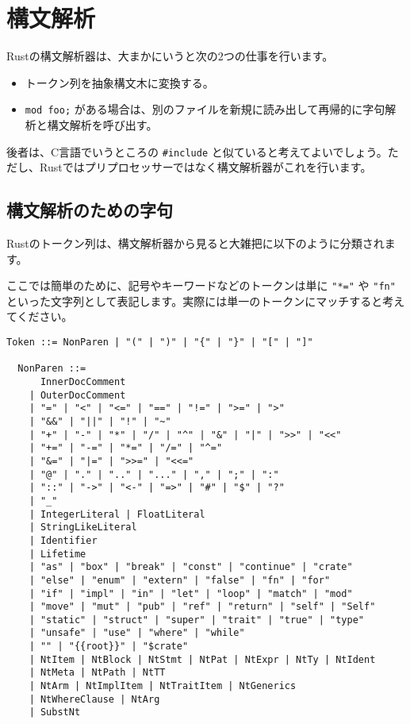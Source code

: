\documentclass[dvipdfmx,uplatex,papersize,a4paper,10pt]{jsbook}
\theoremstyle{definition}
\begin{document}
\section{構文解析}

Rustの構文解析器は、大まかにいうと次の2つの仕事を行います。

\begin{itemize}
  \item トークン列を抽象構文木に変換する。
  \item \verb|mod foo;| がある場合は、別のファイルを新規に読み出して再帰的に字句解析と構文解析を呼び出す。
\end{itemize}

後者は、C言語でいうところの \verb|#include| と似ていると考えてよいでしょう。ただし、Rustではプリプロセッサーではなく構文解析器がこれを行います。

\subsection{構文解析のための字句}

Rustのトークン列は、構文解析器から見ると大雑把に以下のように分類されます。

ここでは簡単のために、記号やキーワードなどのトークンは単に \verb|"*="| や \verb|"fn"| といった文字列として表記します。実際には単一のトークンにマッチすると考えてください。

\begin{lstlisting}[language=BNFLike, gobble=2]
  Token ::= NonParen | "(" | ")" | "{" | "}" | "[" | "]"

  NonParen ::=
      InnerDocComment
    | OuterDocComment
    | "=" | "<" | "<=" | "==" | "!=" | ">=" | ">"
    | "&&" | "||" | "!" | "~"
    | "+" | "-" | "*" | "/" | "^" | "&" | "|" | ">>" | "<<"
    | "+=" | "-=" | "*=" | "/=" | "^="
    | "&=" | "|=" | ">>=" | "<<="
    | "@" | "." | ".." | "..." | "," | ";" | ":"
    | "::" | "->" | "<-" | "=>" | "#" | "$" | "?"
    | "_"
    | IntegerLiteral | FloatLiteral
    | StringLikeLiteral
    | Identifier
    | Lifetime
    | "as" | "box" | "break" | "const" | "continue" | "crate"
    | "else" | "enum" | "extern" | "false" | "fn" | "for"
    | "if" | "impl" | "in" | "let" | "loop" | "match" | "mod"
    | "move" | "mut" | "pub" | "ref" | "return" | "self" | "Self"
    | "static" | "struct" | "super" | "trait" | "true" | "type"
    | "unsafe" | "use" | "where" | "while"
    | "" | "{{root}}" | "$crate"
    | NtItem | NtBlock | NtStmt | NtPat | NtExpr | NtTy | NtIdent
    | NtMeta | NtPath | NtTT
    | NtArm | NtImplItem | NtTraitItem | NtGenerics
    | NtWhereClause | NtArg
    | SubstNt
\end{lstlisting}
\end{document}
